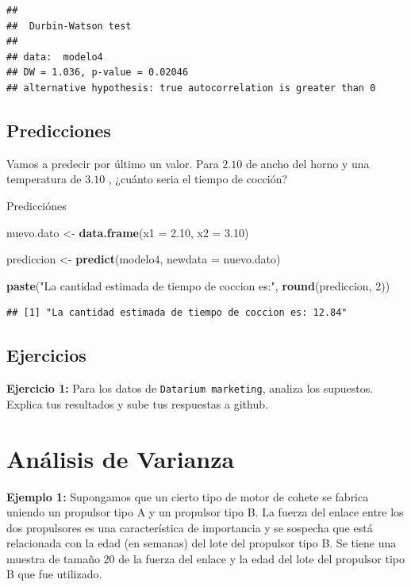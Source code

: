 \documentclass[
]{book}
\newenvironment{Shaded}{\begin{snugshade}}{\end{snugshade}}
\newcommand{\AttributeTok}[1]{\textcolor[rgb]{0.13,0.29,0.53}{#1}}
\newcommand{\DecValTok}[1]{\textcolor[rgb]{0.00,0.00,0.81}{#1}}
\newcommand{\FloatTok}[1]{\textcolor[rgb]{0.00,0.00,0.81}{#1}}
\newcommand{\FunctionTok}[1]{\textcolor[rgb]{0.13,0.29,0.53}{\textbf{#1}}}
\newcommand{\NormalTok}[1]{#1}
\newcommand{\OtherTok}[1]{\textcolor[rgb]{0.56,0.35,0.01}{#1}}
\newcommand{\StringTok}[1]{\textcolor[rgb]{0.31,0.60,0.02}{#1}}
\begin{document}
\begin{verbatim}
## 
##  Durbin-Watson test
## 
## data:  modelo4
## DW = 1.036, p-value = 0.02046
## alternative hypothesis: true autocorrelation is greater than 0
\end{verbatim}

\subsection{Predicciones}\label{predicciones}

Vamos a predecir por último un valor. Para \(2.10\) de ancho del horno y una temperatura de \(3.10\) , ¿cuánto seria el tiempo de cocción?

Predicciónes

\begin{Shaded}
\begin{Highlighting}[]
\NormalTok{nuevo.dato }\OtherTok{\textless{}{-}} \FunctionTok{data.frame}\NormalTok{(}\AttributeTok{x1 =} \FloatTok{2.10}\NormalTok{, }\AttributeTok{x2 =} \FloatTok{3.10}\NormalTok{)}

\NormalTok{prediccion }\OtherTok{\textless{}{-}} \FunctionTok{predict}\NormalTok{(modelo4, }\AttributeTok{newdata =}\NormalTok{ nuevo.dato)}

\FunctionTok{paste}\NormalTok{(}\StringTok{"La cantidad estimada de tiempo de coccion es:"}\NormalTok{, }\FunctionTok{round}\NormalTok{(prediccion, }\DecValTok{2}\NormalTok{))}
\end{Highlighting}
\end{Shaded}

\begin{verbatim}
## [1] "La cantidad estimada de tiempo de coccion es: 12.84"
\end{verbatim}

\subsection{Ejercicios}\label{ejercicios-2}

\textbf{Ejercicio 1:} Para los datos de \texttt{Datarium\ marketing}, analiza los supuestos. Explica tus resultados y sube tus respuestas a github.

\section{Análisis de Varianza}\label{anuxe1lisis-de-varianza}

\textbf{Ejemplo 1: } Supongamos que un cierto tipo de motor de cohete se fabrica uniendo un propulsor tipo A y un propulsor tipo B. La fuerza del enlace entre los dos propulsores es una característica de importancia y se sospecha que está relacionada con la edad (en semanas) del lote del propulsor tipo B. Se tiene una muestra de tamaño 20 de la fuerza del enlace y la edad del lote del propulsor tipo B que fue utilizado.
\end{document}
